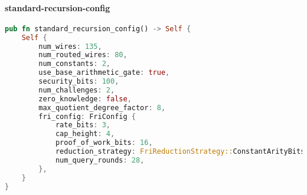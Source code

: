 \paragraph*{standard-recursion-config}

\mbox{}
\begin{lstlisting}[language=rust]
pub fn standard_recursion_config() -> Self {
    Self {
        num_wires: 135,
        num_routed_wires: 80,
        num_constants: 2,
        use_base_arithmetic_gate: true,
        security_bits: 100,
        num_challenges: 2,
        zero_knowledge: false,
        max_quotient_degree_factor: 8,
        fri_config: FriConfig {
            rate_bits: 3,
            cap_height: 4,
            proof_of_work_bits: 16,
            reduction_strategy: FriReductionStrategy::ConstantArityBits(4, 5),
            num_query_rounds: 28,
        },
    }
}  
\end{lstlisting}
